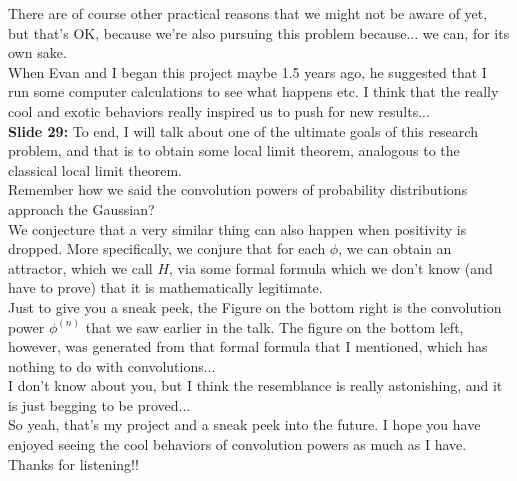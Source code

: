 \documentclass[11pt]{article}
\begin{document}
There are of course other practical reasons that we might not be aware of yet, but that's OK, because we're also pursuing this problem because... we can, for its own sake. \\


When Evan and I began this project maybe 1.5 years ago, he suggested that I run some computer calculations to see what happens etc. I think that the really cool and exotic behaviors really inspired us to push for new results... \\



\noindent \textbf{Slide 29:} To end, I will talk about one of the ultimate goals of this research problem, and that is to obtain some local limit theorem, analogous to the classical local limit theorem.  \\

Remember how we said the convolution powers of probability distributions approach the Gaussian?\\



We conjecture that a very similar thing can also happen when positivity is dropped. More specifically, we conjure that for each $\phi$, we can obtain an attractor, which we call $H$, via some formal formula which we don't know (and have to prove) that it is mathematically legitimate. \\


Just to give you a sneak peek, the Figure on the bottom right is the convolution power $\phi^{(n)}$ that we saw earlier in the talk. The figure on the bottom left, however, was generated from that formal formula that I mentioned, which has nothing to do with convolutions...\\
 

I don't know about you, but I think the resemblance is really astonishing, and it is just begging to be proved...\\


So yeah, that's my project and a sneak peek into the future. I hope you have enjoyed seeing the cool behaviors of convolution powers as much as I have. Thanks for listening!!






	
	
\end{document}
